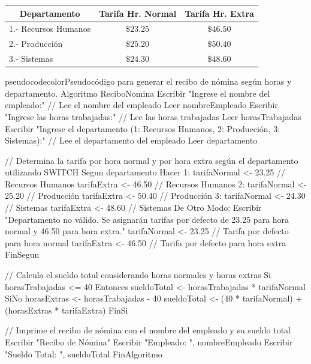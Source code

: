 \documentclass[
	spanish, %
	letterpaper, oneside
]{article}
\begin{document}
\begin{tabular}{|l|c|c|}
\hline \multicolumn{1}{|c|}{ Departamento } & Tarifa Hr. Normal & Tarifa Hr. Extra \\
\hline 1.- Recursos Humanos & $\$ 23.25$ & $\$ 46.50$ \\
\hline 2.- Producción & $\$ 25.20$ & $\$ 50.40$ \\
\hline 3.- Sistemas & $\$ 24.30$ & $\$ 48.60$ \\
\hline
\end{tabular}

\begin{sourcecode}{pseudocodecolor}{Pseudocódigo para generar el recibo de nómina según horas y departamento.}
Algoritmo ReciboNomina
    Escribir "Ingrese el nombre del empleado:"
    // Lee el nombre del empleado
    Leer nombreEmpleado
    Escribir "Ingrese las horas trabajadas:"
    // Lee las horas trabajadas
    Leer horasTrabajadas
    Escribir "Ingrese el departamento (1: Recursos Humanos, 2: Producción, 3: Sistemas):"
    // Lee el departamento del empleado
    Leer departamento
    
    // Determina la tarifa por hora normal y por hora extra según el departamento utilizando SWITCH
    Segun departamento Hacer
        1: 
            tarifaNormal <- 23.25 // Recursos Humanos
            tarifaExtra <- 46.50 // Recursos Humanos
        2: 
            tarifaNormal <- 25.20 // Producción
            tarifaExtra <- 50.40 // Producción
        3: 
            tarifaNormal <- 24.30 // Sistemas
            tarifaExtra <- 48.60 // Sistemas
        De Otro Modo:
            Escribir "Departamento no válido. Se asignarán tarifas por defecto de 23.25 para hora normal y 46.50 para hora extra."
            tarifaNormal <- 23.25 // Tarifa por defecto para hora normal
            tarifaExtra <- 46.50 // Tarifa por defecto para hora extra
    FinSegun
    
    // Calcula el sueldo total considerando horas normales y horas extras
    Si horasTrabajadas <= 40 Entonces
        sueldoTotal <- horasTrabajadas * tarifaNormal
    SiNo
        horasExtras <- horasTrabajadas - 40
        sueldoTotal <- (40 * tarifaNormal) + (horasExtras * tarifaExtra)
    FinSi
    
    // Imprime el recibo de nómina con el nombre del empleado y su sueldo total
    Escribir "Recibo de Nómina"
    Escribir "Empleado: ", nombreEmpleado
    Escribir "Sueldo Total: ", sueldoTotal
FinAlgoritmo
\end{sourcecode}




\end{document}
